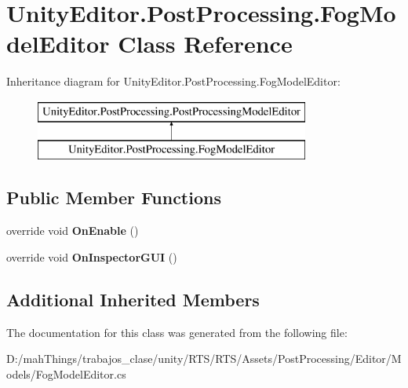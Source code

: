 \hypertarget{class_unity_editor_1_1_post_processing_1_1_fog_model_editor}{}\section{Unity\+Editor.\+Post\+Processing.\+Fog\+Model\+Editor Class Reference}
\label{class_unity_editor_1_1_post_processing_1_1_fog_model_editor}
Inheritance diagram for Unity\+Editor.\+Post\+Processing.\+Fog\+Model\+Editor\+:\begin{figure}[H]
\begin{center}
\leavevmode
\includegraphics[height=2.000000cm]{class_unity_editor_1_1_post_processing_1_1_fog_model_editor}
\end{center}
\end{figure}
\subsection*{Public Member Functions}
\begin{DoxyCompactItemize}
\item 
\mbox{\label{class_unity_editor_1_1_post_processing_1_1_fog_model_editor_af4c50497dc8b6d6fa9a1f117be43c18b}} 
override void {\bfseries On\+Enable} ()
\item 
\mbox{\label{class_unity_editor_1_1_post_processing_1_1_fog_model_editor_a31db175fb963bd4313e4d49a73d39f47}} 
override void {\bfseries On\+Inspector\+G\+UI} ()
\end{DoxyCompactItemize}
\subsection*{Additional Inherited Members}


The documentation for this class was generated from the following file\+:\begin{DoxyCompactItemize}
\item 
D\+:/mah\+Things/trabajos\+\_\+clase/unity/\+R\+T\+S/\+R\+T\+S/\+Assets/\+Post\+Processing/\+Editor/\+Models/Fog\+Model\+Editor.\+cs\end{DoxyCompactItemize}
